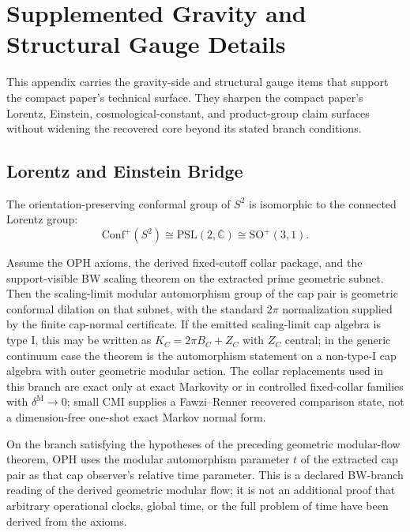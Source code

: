 \section{Supplemented Gravity and Structural Gauge Details}
\label{app:compact-technical-port}

This appendix carries the gravity-side and structural gauge items that support the compact paper's
technical surface. They sharpen the compact paper's Lorentz,
Einstein, cosmological-constant, and product-group claim surfaces without widening the recovered
core beyond its stated branch conditions.

\subsection{Lorentz and Einstein Bridge}

\begin{theorem}
The orientation-preserving conformal group of \(S^2\) is isomorphic to the connected Lorentz
group:
\[
\mathrm{Conf}^+(S^2)\cong \mathrm{PSL}(2,\mathbb C)\cong \mathrm{SO}^+(3,1).
\]
\end{theorem}

\begin{theorem}
Assume the OPH axioms, the derived fixed-cutoff collar package, and the support-visible BW
scaling theorem on the extracted prime geometric subnet. Then the scaling-limit modular
automorphism group of the cap pair is geometric conformal dilation on that
subnet, with the standard \(2\pi\) normalization supplied by the finite cap-normal certificate.
If the emitted scaling-limit cap algebra is type I, this may be written as
\(K_C=2\pi B_C+Z_C\) with \(Z_C\) central; in the generic continuum case the theorem is the
automorphism statement on a non-type-I cap algebra with outer geometric modular action. The collar
replacements used in this branch are exact only at exact Markovity or in
controlled fixed-collar families with \(\delta^{\mathrm M}\to0\); small CMI supplies a
Fawzi--Renner recovered comparison state, not a dimension-free one-shot exact Markov normal form.
\end{theorem}

\begin{definition}
On the branch satisfying the hypotheses of the preceding geometric modular-flow theorem, OPH uses
the modular automorphism parameter \(t\) of the extracted cap pair as that cap observer's relative
time parameter. This is a declared BW-branch reading of the derived geometric modular flow; it is
not an additional proof that arbitrary operational clocks, global time, or the full problem of time
have been derived from the axioms.
\end{definition}

